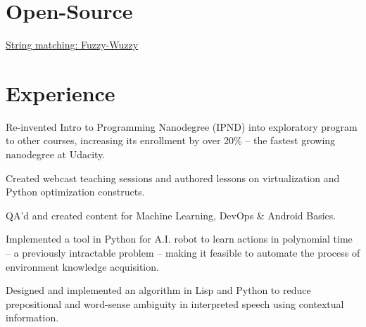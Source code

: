 \documentclass[]{deedy-resume-openfont}
\begin{document}
\begin{minipage}[t]{0.31\textwidth}
\section{Open-Source}
\textbullet{} \color{cyan}\underline{\color{cyan}\href{https://github.com/seatgeek/fuzzywuzzy}{\color{cyan}String matching: Fuzzy-Wuzzy}}

%
%

\end{minipage} 
\hfill
\begin{minipage}[t]{0.66\textwidth} 


\section{Experience}

\vspace{\topsep} %
\begin{tightemize}

\item Re-invented Intro to Programming Nanodegree (IPND) into exploratory program to other courses, increasing its enrollment by over 20\% -- the fastest growing nanodegree at Udacity.

\item Created webcast teaching sessions and authored lessons on virtualization and Python optimization constructs.

\item QA'd and created content for Machine Learning, DevOps \& Android Basics.

\end{tightemize}
\sectionsep

\begin{tightemize}
\item Implemented a tool in Python for A.I. robot to learn actions in polynomial time -- a previously intractable problem -- making it feasible to automate the process of environment knowledge acquisition.

\item Designed and implemented an algorithm in Lisp and Python to reduce prepositional and word-sense ambiguity in interpreted speech using contextual information.
\end{tightemize}
\sectionsep


\end{minipage}
\end{document}
